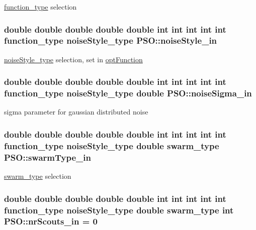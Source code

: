 \hyperlink{optfunctions_8h_6e6333c061b2073ba9abaaf67e20164b}{function\_\-type} selection 

\hypertarget{classPSO_101f44d2d9a8212e864ee9264008f82c}{
\subsubsection{\setlength{\rightskip}{0pt plus 5cm}double double double double double int int int int int {\bf function\_\-type} {\bf noiseStyle\_\-type} {\bf PSO::noiseStyle\_\-in}}}
\label{classPSO_101f44d2d9a8212e864ee9264008f82c}


\hyperlink{optfunctions_8h_b2443d91d959f9b3a033d74864a28862}{noiseStyle\_\-type} selection, set in \hyperlink{classPSO_2e4ade153c87e3ebd19c7e02ce2f8522}{optFunction} 

\hypertarget{classPSO_bd89c0b6a62d591215f8660ecbcc7fcf}{
\subsubsection{\setlength{\rightskip}{0pt plus 5cm}double double double double double int int int int int {\bf function\_\-type} {\bf noiseStyle\_\-type} double {\bf PSO::noiseSigma\_\-in}}}
\label{classPSO_bd89c0b6a62d591215f8660ecbcc7fcf}


sigma parameter for gaussian distributed noise 

\hypertarget{classPSO_81b27d7f9fd7ecf507e35e202487161e}{
\subsubsection{\setlength{\rightskip}{0pt plus 5cm}double double double double double int int int int int {\bf function\_\-type} {\bf noiseStyle\_\-type} double {\bf swarm\_\-type} {\bf PSO::swarmType\_\-in}}}
\label{classPSO_81b27d7f9fd7ecf507e35e202487161e}


\hyperlink{pso_8h_42bcedc2c7cf9459c9669f9df4f61ebd}{swarm\_\-type} selection 

\hypertarget{classPSO_4441f878ff6f5bcc7b0b75245561a693}{
\subsubsection{\setlength{\rightskip}{0pt plus 5cm}double double double double double int int int int int {\bf function\_\-type} {\bf noiseStyle\_\-type} double {\bf swarm\_\-type} int {\bf PSO::nrScouts\_\-in} = 0}}
\label{classPSO_4441f878ff6f5bcc7b0b75245561a693}


